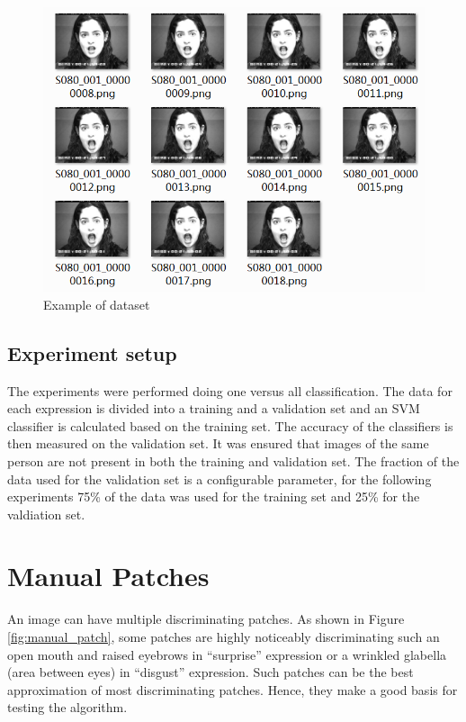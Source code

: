 \begin{figure}[h!]
\centering
\includegraphics[scale=0.55]{img/example.png}
\caption{Example of dataset}
\label{Example of dataset}
\end{figure}

\subsection{Experiment setup}
The experiments were performed doing one versus all classification. The data for each expression is divided into a training and a validation set and an SVM
classifier is calculated based on the training set. The accuracy of the classifiers is then measured on the validation set. It was ensured that images of the same
person are not present in both the training and validation set. The fraction of the data used for the validation set is a configurable parameter, for the 
following experiments 75\% of the data was used for the training set and 25\% for the valdiation set. 

\section{Manual Patches}

An image can have multiple discriminating patches. As shown in Figure \ref{fig:manual_patch}, some patches are highly noticeably discriminating such an open mouth and raised eyebrows in "`surprise"' expression or a wrinkled glabella (area between eyes) in "`disgust"' expression. Such patches can be the best approximation of most discriminating patches. Hence, they make a good basis for testing the algorithm. 

